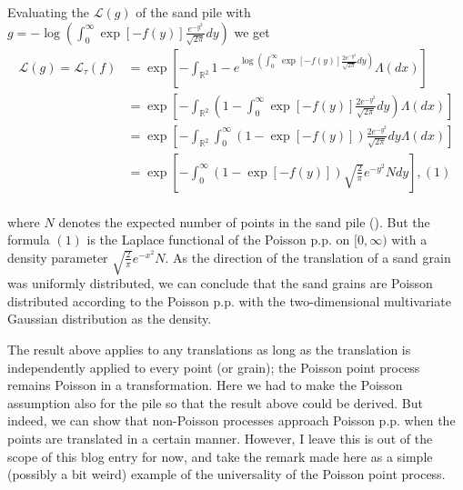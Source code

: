 \documentclass{article}
\begin{document}
  Evaluating the   $\mathcal{L}(g)$ of the sand pile with $ g = - \log \left(   \int_{0}^{\infty}  \exp \left[  -f(y)  \right] \frac{e^{-y^2}}{\sqrt{2 \pi}} dy \right)  $ we get
  \begin{align*}
    \mathcal{L}(g) = \mathcal{L}_{\tau}(f)& = \exp \left[  -\int_{\mathbb{R}^2} 1 -  e^{\log \left(   \int_{0}^{\infty}  \exp \left[  -f(y)   \right] \frac{2e^{-y^2}}{\sqrt{2 \pi}} dy \right) }\Lambda(dx) \right]    \\
    &= \exp \left[-\int_{\mathbb{R}^2} \left(1  -   \int_{0}^{\infty}  \exp [-f(y)] \frac{2e^{-y^2}}{\sqrt{2 \pi}}  dy \right)  \Lambda(dx)  \right] \\
    &= \exp \left[-\int_{\mathbb{R}^2}\int_{0}^{\infty} \left(1  -     \exp [-f(y)]   \right) \frac{2e^{-y^2}}{\sqrt{2 \pi}}dy  \Lambda(dx)  \right] \\ 
    &= \exp \left[-\int_{0}^{\infty} \left(1  -     \exp [-f(y)]   \right)  \sqrt{\frac{2}{\pi}}e^{-y^2} N dy    \right], (1) \\   
  \end{align*}

  where $N$ denotes the expected number of points in the sand pile (). But the formula $(1)$ is the Laplace functional of the Poisson p.p. on $[0, \infty)$ with a density parameter $\sqrt{\frac{2}{\pi}}e^{-x^2} N.$  As the direction of the translation of a sand grain was uniformly distributed, we can conclude that the sand grains are Poisson distributed according to the Poisson p.p. with the two-dimensional multivariate Gaussian distribution as the density.
    
    The result above applies to any translations as long as the translation is independently applied to every point (or grain); the Poisson point process remains Poisson in a transformation. Here we had to make the Poisson assumption also for the pile so that the result above could be derived. But indeed, we can show that non-Poisson processes approach Poisson p.p. when the points are translated in a certain manner. However, I leave this is out of the scope of this blog entry for now, and take the remark made here as a simple (possibly a bit weird) example of the universality of the Poisson point process.
    
\end{document}
